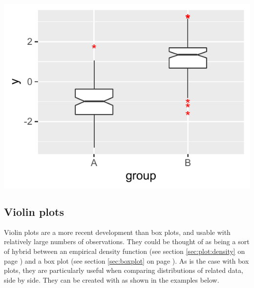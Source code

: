 \documentclass[krantz2]{krantz}\usepackage{knitr}
\begin{document}
\begin{knitrout}\footnotesize
{}\color{fgcolor}\begin{kframe}
\begin{alltt}
  \hlopt{+}
  \hlstd{(} \hlstd{=} \hlstd{,}  \hlstd{=} \hlstd{,}
                \hlstd{=} \hlstd{,}  \hlstd{=} \hlstd{,}  \hlstd{=} \hlstd{)}
\end{alltt}
\end{kframe}

{\centering \includegraphics[width=.54\textwidth]{figure/pos-bw-plot-02-1} 

}


\end{knitrout}


\subsection{Violin plots}\label{sec:plot:violin}

Violin plots are a more recent development than box plots, and usable with relatively large numbers of observations. They could be thought of as being a sort of hybrid between an empirical density function (see section \ref{sec:plot:density} on page \pageref{sec:plot:density}) and a box plot (see section \ref{sec:boxplot} on page \pageref{sec:boxplot}). As is the case with box plots, they are particularly useful when comparing distributions of related data, side by side. They can be created with   as shown in the examples below.

\begin{knitrout}\footnotesize
{}\color{fgcolor}\begin{kframe}
\begin{alltt}
  \hlopt{+}
  \hlstd{()}
\end{alltt}
\end{kframe}
\end{knitrout}
\end{document}
